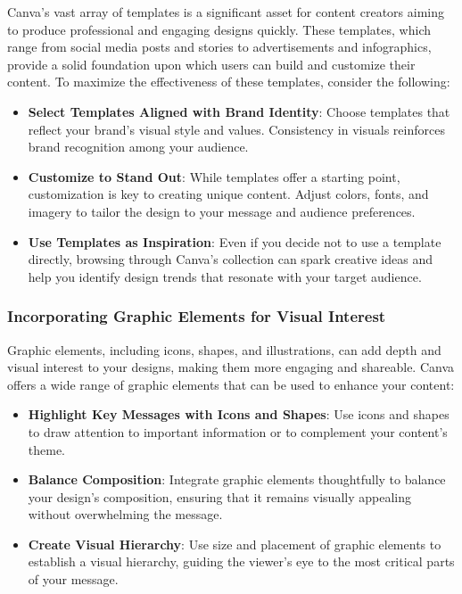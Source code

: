 \documentclass[
]{book}
\providecommand{\tightlist}{%
  \setlength{\itemsep}{0pt}\setlength{\parskip}{0pt}}
\begin{document}
Canva's vast array of templates is a significant asset for content creators aiming to produce professional and engaging designs quickly. These templates, which range from social media posts and stories to advertisements and infographics, provide a solid foundation upon which users can build and customize their content. To maximize the effectiveness of these templates, consider the following:

\begin{itemize}
\tightlist
\item
  \textbf{Select Templates Aligned with Brand Identity}: Choose templates that reflect your brand's visual style and values. Consistency in visuals reinforces brand recognition among your audience.
\item
  \textbf{Customize to Stand Out}: While templates offer a starting point, customization is key to creating unique content. Adjust colors, fonts, and imagery to tailor the design to your message and audience preferences.
\item
  \textbf{Use Templates as Inspiration}: Even if you decide not to use a template directly, browsing through Canva's collection can spark creative ideas and help you identify design trends that resonate with your target audience.
\end{itemize}

\hypertarget{incorporating-graphic-elements-for-visual-interest}{%
\subsubsection*{Incorporating Graphic Elements for Visual Interest}\label{incorporating-graphic-elements-for-visual-interest}}

Graphic elements, including icons, shapes, and illustrations, can add depth and visual interest to your designs, making them more engaging and shareable. Canva offers a wide range of graphic elements that can be used to enhance your content:

\begin{itemize}
\tightlist
\item
  \textbf{Highlight Key Messages with Icons and Shapes}: Use icons and shapes to draw attention to important information or to complement your content's theme.
\item
  \textbf{Balance Composition}: Integrate graphic elements thoughtfully to balance your design's composition, ensuring that it remains visually appealing without overwhelming the message.
\item
  \textbf{Create Visual Hierarchy}: Use size and placement of graphic elements to establish a visual hierarchy, guiding the viewer's eye to the most critical parts of your message.
\end{itemize}
\end{document}
